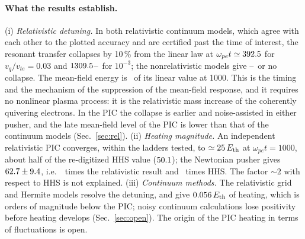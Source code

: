 \documentclass[aps,pre,reprint,floatfix,amsmath,amssymb,nofootinbib,superscriptaddress]{revtex4-2}
\newcommand{\vq}{v_q/v_{te}}
\newcommand{\wpe}{\omega_{pe}}
\begin{document}
\paragraph*{What the results establish.} (i) \emph{Relativistic detuning.} In both relativistic continuum models, which agree with each other to the plotted accuracy and are certified past the time of interest, the resonant transfer collapses by 10\,\% from the linear law at $\wpe t\simeq\herCol$ for $\vq=0.03$ and $1309.5$--\relColWeakShot\ for $10^{-3}$; the nonrelativistic models give \nrColLo--\nrColHi\ or no collapse. The mean-field energy is \herFld\ of its linear value at 1000. This is the timing and the mechanism of the suppression of the mean-field response, and it requires no nonlinear plasma process: it is the relativistic mass increase of the coherently quivering electrons. In the PIC the collapse is earlier and noise-assisted in either pusher, and the late mean-field level of the PIC is lower than that of the continuum models (Sec.~\ref{sec:rel}). (ii) \emph{Heating magnitude.} An independent relativistic PIC converges, within the ladders tested, to $\simeq25\,E_{\rm th}$ at $\wpe t=1000$, about half of the re-digitized HHS value ($50.1$); the Newtonian pusher gives $62.7\pm9.4$, i.e.\ \pcNewtRel\ times the relativistic result and \pcNewtHHS\ times HHS. The factor $\sim2$ with respect to HHS is not explained. (iii) \emph{Continuum methods.} The relativistic grid and Hermite models resolve the detuning, and give $0.056\,E_{\rm th}$ of heating, which is orders of magnitude below the PIC; noisy continuum calculations lose positivity before heating develops (Sec.~\ref{sec:open}). The origin of the PIC heating in terms of fluctuations is open.
\end{document}
